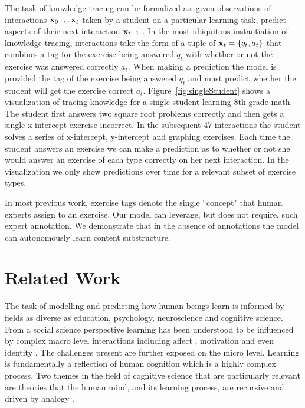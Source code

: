 The task of knowledge tracing can be formalized as: given observations of interactions $\mathbf x_0 \dots \mathbf x_{t}$ taken by a student on a particular learning task, predict aspects of their next interaction $\mathbf x_{t+1}$ \cite{corbett1994knowledge}. In the most ubiquitous instantiation of knowledge tracing, interactions take the form of a tuple of $\mathbf x_t = \{q_t, a_t\}$ that combines a tag for the exercise being answered $q_t$ with whether or not the exercise was answered correctly $a_t$.  When making a prediction the model is provided the tag of the exercise being answered $q_t$ and must predict whether the student will get the exercise correct $a_t$. Figure~\ref{fig:singleStudent} shows a visualization of tracing knowledge for a single student learning 8th grade math. The student first answers two square root problems correctly and then gets a single x-intercept exercise incorrect. In the subsequent 47 interactions the student solves a series of x-intercept, y-intercept and graphing exercises. Each time the student answers an exercise we can make a prediction as to whether or not she would answer an exercise of each type correctly on her next interaction. In the visualization we only show predictions over time for a relevant subset of exercise types.

In most previous work, exercise tags denote the single ``concept" that human experts assign to an exercise.
Our model can leverage, but does not require, such expert annotation. We demonstrate that in the absence of annotations the model can autonomously learn content substructure.

\section{Related Work}

The task of modelling and predicting how human beings learn is informed by fields as diverse as education, psychology, neuroscience and cognitive science. From a social science perspective learning has been understood to be influenced by complex macro level interactions including affect \cite{linnenbrink2004role},
motivation \cite{elliot2013handbook}
and even identity \cite{cohen2008identity}. The challenges present are further exposed on the micro level. Learning is fundamentally a reflection of human cognition which is a highly complex process. Two themes in the field of cognitive science that are particularly relevant are theories that the human mind, and its learning process, are recursive \cite{fitch2005evolution} and driven by analogy \cite{gentner1983structure}.

